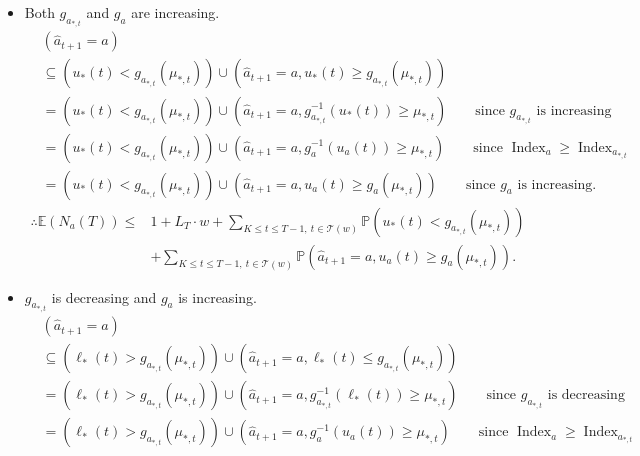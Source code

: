\documentclass[letterpaper]{article} %
\newcommand{\ArmAt}{\hat{a}}
\newcommand{\IsEqual}{=}
\newcommand{\optArm}[1]{a_{*, #1}}
\newcommand{\optMean}[1]{\mu_{*, #1}}
\newcommand{\noChange}{\mathcal{T}}
\newcommand{\numChanges}{L}
\newcommand{\windowsize}{w}
\begin{document}
\begin{itemize}
\item Both $g_{\optArm{t}}$ and $g_a$ are increasing. %
\begin{align*}
&(\ArmAt_{t+1} \IsEqual a) \\
&\subseteq \left(u_*(t) < g_{\optArm{t}}(\optMean{t})\right) \cup \left(\ArmAt_{t+1} \IsEqual a, u_*(t) \geq g_{\optArm{t}}(\optMean{t})\right) \\
&= \left(u_*(t) < g_{\optArm{t}}(\optMean{t})\right) \cup \left(\ArmAt_{t+1} \IsEqual a, g^{-1}_{\optArm{t}}(u_*(t)) \geq \optMean{t}\right) \qquad \text{since $g_{\optArm{t}}$ is increasing}\\
&= \left(u_*(t) < g_{\optArm{t}}(\optMean{t})\right) \cup \left(\ArmAt_{t+1} \IsEqual a, g^{-1}_a(u_a(t)) \geq \optMean{t}\right) \qquad \text{since $\operatorname{Index}_a \geq \operatorname{Index}_{\optArm{t}}$}\\
&= \left(u_*(t) < g_{\optArm{t}}(\optMean{t})\right) \cup \left(\ArmAt_{t+1} \IsEqual a, u_a(t) \geq g_a(\optMean{t})\right) \qquad \text{since $g_a$ is increasing.}
\end{align*}
\begin{align}
\label{exp_of_N_eq1}
\therefore \mathds{E}(N_a(T)) \leq &1 + \numChanges_T \cdot \windowsize +  \sum_{K \leq t \leq T-1, \ t \in \noChange(\windowsize)} \mathds{P}\left(u_*(t) < g_{\optArm{t}}(\optMean{t})\right) \nonumber \\
%
&+ \sum_{K \leq t \leq T-1, \ t \in \noChange(\windowsize)} \mathds{P}\left(\ArmAt_{t+1} \IsEqual a, u_a(t) \geq g_a(\optMean{t})\right).
\end{align}
\item $g_{\optArm{t}}$ is decreasing and $g_a$ is increasing. %
\begin{align*}
&(\ArmAt_{t+1} \IsEqual a) \\
&\subseteq \left(\ell_*(t) > g_{\optArm{t}}(\optMean{t})\right) \cup \left(\ArmAt_{t+1} \IsEqual a, \ell_*(t) \leq g_{\optArm{t}}(\optMean{t})\right) \\
&= \left(\ell_*(t) > g_{\optArm{t}}(\optMean{t})\right) \cup \left(\ArmAt_{t+1} \IsEqual a, g_{\optArm{t}}^{-1}(\ell_*(t)) \geq \optMean{t}\right) \qquad \text{since $g_{\optArm{t}}$ is decreasing} \\
&= \left(\ell_*(t) > g_{\optArm{t}}(\optMean{t})\right) \cup \left(\ArmAt_{t+1} \IsEqual a, g_a^{-1}(u_a(t)) \geq \optMean{t}\right) \qquad \text{since $\operatorname{Index}_a \geq \operatorname{Index}_{\optArm{t}}$}\\

\end{align*}
\end{itemize}
\end{document}
